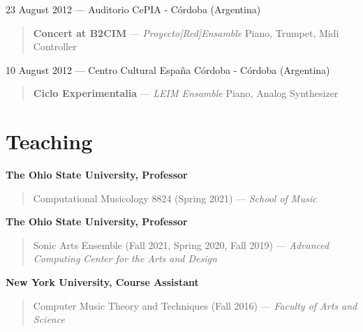 \documentclass[12pt,overlapped]{res}%
\begin{document}
\begin{resume}
23 August 2012 --- Auditorio CePIA - Córdoba (Argentina)%
\begin{quote}
\par
\textbf{Concert at B2CIM} --- \textit{Proyecto{[}Red{]}Ensamble}
Piano, Trumpet, Midi Controller
\end{quote}%
%
%
%
10 August 2012 --- Centro Cultural España Córdoba - Córdoba (Argentina)%
\begin{quote}
\par
\textbf{Ciclo Experimentalia} --- \textit{LEIM Ensamble}
Piano, Analog Synthesizer
\end{quote}%
%
%
%

\section{Teaching}%
%
%
%
\textbf{The Ohio State University, Professor}
\begin{quote}
Computational Musicology 8824 (Spring 2021) --- 
\textit{School of Music}
\end{quote}%
%
%
%
\textbf{The Ohio State University, Professor}
\begin{quote}
Sonic Arts Ensemble (Fall 2021, Spring 2020, Fall 2019) --- 
\textit{Advanced Computing Center for the Arts and Design}
\end{quote}%
%
%
%

%
%
%

\textbf{New York University, Course Assistant}
\begin{quote}
Computer Music Theory and Techniques (Fall 2016) --- 
\textit{Faculty of Arts and Science}
\end{quote}%
%
%
%


\end{resume}
\end{document}
